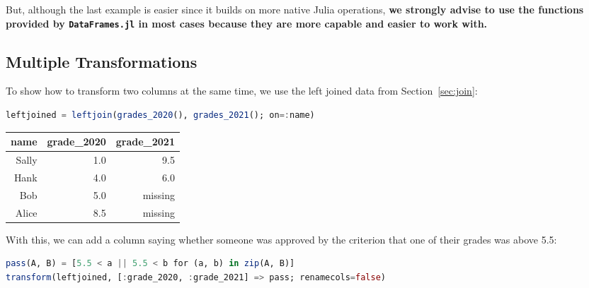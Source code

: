\documentclass[
  notoc %
]{tufte-book}
\newcommand{\passthrough}[1]{#1}
\begin{document}
But, although the last example is easier since it builds on more native
Julia operations, \textbf{we strongly advise to use the functions
provided by \passthrough{\lstinline!DataFrames.jl!} in most cases
because they are more capable and easier to work with.}

\hypertarget{sec:multiple_transform}{%
\subsection{Multiple Transformations}\label{sec:multiple_transform}}

To show how to transform two columns at the same time, we use the left
joined data from Section~\ref{sec:join}:

\begin{lstlisting}[language=Julia]
leftjoined = leftjoin(grades_2020(), grades_2021(); on=:name)
\end{lstlisting}

\begin{longtable}[]{@{}rrr@{}}
\toprule()
name & grade\_2020 & grade\_2021 \\
\midrule()
\endhead
Sally & 1.0 & 9.5 \\
Hank & 4.0 & 6.0 \\
Bob & 5.0 & missing \\
Alice & 8.5 & missing \\
\bottomrule()
\end{longtable}

With this, we can add a column saying whether someone was approved by
the criterion that one of their grades was above 5.5:

\begin{lstlisting}[language=Julia]
pass(A, B) = [5.5 < a || 5.5 < b for (a, b) in zip(A, B)]
transform(leftjoined, [:grade_2020, :grade_2021] => pass; renamecols=false)
\end{lstlisting}
\end{document}
